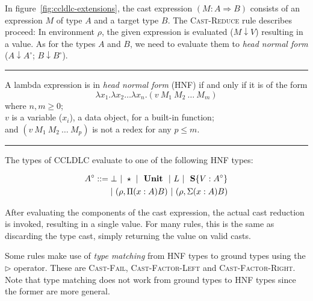 In figure~\ref{fig:ccldlc-extensions}, the cast expression $(M : A \Rightarrow B)$ consists of an expression $M$ of type $A$ and a target type $B$. The \textsc{Cast-Reduce} rule describes proceed: In environment $\rho$, the given expression is evaluated ($M \downarrow V$) resulting in a value. As for the types $A$ and $B$, we need to evaluate them to \emph{head normal form} ($A \downarrow A^\circ$; $B \downarrow B^\circ$).

\vspace{4ex}\hrule

\renewcommand{\mkcitation}[1]{\\--- #1}
\begin{displayquote}
A lambda expression is in \emph{head normal form} (HNF) if and only if it is of the form
\begin{equation*}
\lambda x_1 . \lambda x_2 \dots \lambda x_n . (v~M_1~M_2~\dots~M_m)
\end{equation*}
where $n, m \geq 0$; \\
\hspace*{11mm}$v$ is a variable ($x_i$), a data object, for a built-in function; \\
and \hspace*{2mm} $(v~M_1~M_2~\dots~M_p)$ is not a redex for any $p \leq m$.
\end{displayquote}

\hrule\vspace{4ex}

The types of CCLDLC evaluate to one of the following HNF types:

\begin{equation}
\begin{split}
 A^\circ ::= \bot ~|~ \star ~|~ \text{ \textbf{Unit} } ~|~ L ~|~ \text{ \textbf{S}}\{V:A^\circ\} \\
 |~ (\rho, \Pi(x:A)B) ~|~ (\rho, \Sigma(x:A)B)
\end{split}
\end{equation}

After evaluating the components of the cast expression, the actual cast reduction is invoked, resulting in a single value. For many rules, this is the same as discarding the type cast, simply returning the value on valid casts.

Some rules make use of \emph{type matching} from HNF types to ground types using the $\rhd$ operator. These are \textsc{Cast-Fail}, \textsc{Cast-Factor-Left} and \textsc{Cast-Factor-Right}. Note that type matching does not work from ground types to HNF types since the former are more general.

